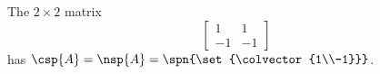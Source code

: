 The $2\times 2$ matrix
%
\begin{equation*}
\begin{bmatrix}
1&1\\
-1&-1
\end{bmatrix}
\end{equation*}
%
has $\csp{A}=\nsp{A}=\spn{\set{\colvector{1\\-1}}}$.